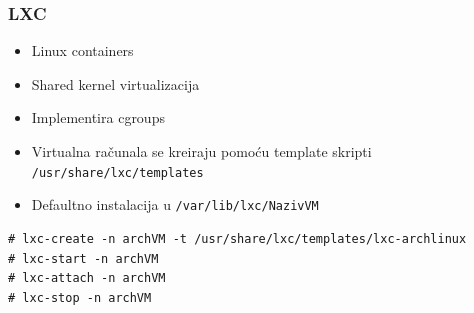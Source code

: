 \documentclass[t]{beamer}
\begin{document}
\begin{frame}[fragile]
	\frametitle{LXC}

	\begin{itemize}
		\item Linux containers
		
		\item Shared kernel virtualizacija
		\item Implementira cgroups
	\end{itemize}

	\begin{itemize}
		\item Virtualna računala se kreiraju pomoću template skripti \texttt{/usr/share/lxc/templates}
		\item Defaultno instalacija u \texttt{/var/lib/lxc/NazivVM}
	\end{itemize}
	
	\scriptsize
	\begin{verbatim}
# lxc-create -n archVM -t /usr/share/lxc/templates/lxc-archlinux
# lxc-start -n archVM
# lxc-attach -n archVM
# lxc-stop -n archVM
	\end{verbatim}

\end{frame}
\end{document}
